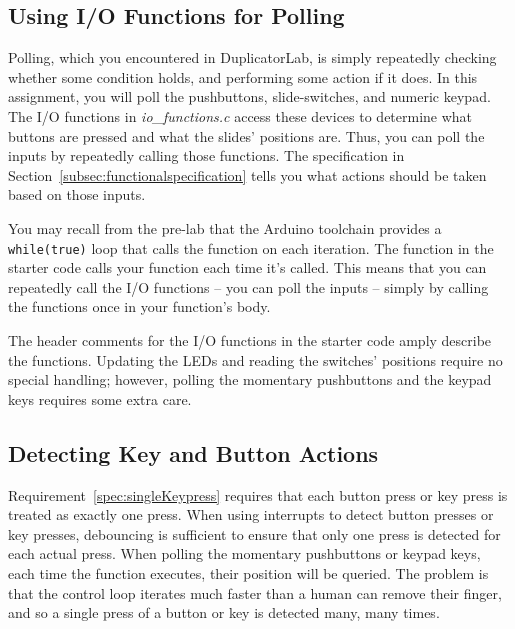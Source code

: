 \subsection{Using I/O Functions for Polling}

Polling, which you encountered in DuplicatorLab, is simply repeatedly checking whether some condition holds, and performing some action if it does.
In this assignment, you will poll the pushbuttons, slide-switches, and numeric keypad.
The I/O functions in \textit{io\_functions.c} access these devices to determine what buttons are pressed and what the slides' positions are.
Thus, you can poll the inputs by repeatedly calling those functions.
The specification in Section~\ref{subsec:functionalspecification} tells you what actions should be taken based on those inputs.

You may recall from the pre-lab that the Arduino toolchain provides a \lstinline{while(true)} loop that calls the  function on each iteration.
The  function in the starter code calls your  function each time it's called.
This means that you can repeatedly call the I/O functions -- you can poll the inputs -- simply by calling the functions once in your  function's body.

The header comments for the I/O functions in the starter code amply describe the functions.
Updating the LEDs and reading the switches' positions require no special handling;
however, polling the momentary pushbuttons and the keypad keys requires some extra care.

\subsection{Detecting Key and Button Actions}

Requirement~\ref{spec:singleKeypress} requires that each button press or key press is treated as exactly one press.
When using interrupts to detect button presses or key presses, debouncing is sufficient to ensure that only one press is detected for each actual press.
When polling the momentary pushbuttons or keypad keys, each time the  function executes, their position will be queried.
The problem is that the control loop iterates much faster than a human can remove their finger, and so a single press of a button or key is detected many, many times.

%

